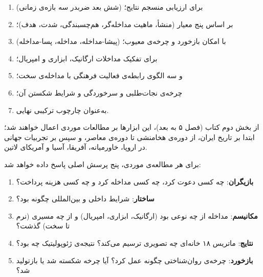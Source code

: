 \begin{enumerate}[label=\textbf{\arabic*.}, nosep, rightmargin=1em]
\item {} (شش بعد ضربدر سه
بازه‌ی زمانی) برای ارزیابی منسجم نتایج؛
\item {} بر اساس پنج معیار
(منشأ، ماهیت مداخله‌گر، هم‌چسبندگی، شدت، هدف)؛
\item {} (پیشا-مداخله، مداخله،
پسا-مداخله) با امکان بازخورد و چرخه‌ی معیوب؛
\item {} برای تفکیک مداخلات ارگانیک،
ابزاری و امپریال؛
\item {} و سه الگوی رابطه‌ی فعالیت
فرهنگی با مداخله‌ی سخت؛
\item {} چرخه‌ی نجات‌طلبی و سرخوردگی
و شرایط شکستن آن؛
\item {} به‌عنوان چارچوب ترکیبی نهایی.
\end{enumerate}

از بخش دوم کتاب (فصل ۵ به بعد)، این ابزارها بر مطالعات موردی
اعمال خواهند شد؛ ابتدا بر تاریخ ایران، از دوره‌ی هخامنشی تا
دوره‌ی معاصر، و سپس بر تجربیات جهانی در اروپا، خاورمیانه،
آفریقا، آسیا و آمریکای لاتین.

\begin{tcolorbox}[mybox,
title={پرسش راهنمای مطالعات موردی}]
برای هر مطالعه‌ی موردی، پنج پرسش اصلی پاسخ داده خواهد شد:

\begin{enumerate}[label=\textbf{پرسش \arabic*:}, nosep, rightmargin=1em]
\item \textbf{بازیگران}: چه کسی دعوت کرد، چه کسی مداخله کرد
و چه کسی هزینه پرداخت؟
\item \textbf{ساختار}: شرایط داخلی و بین‌المللی چگونه بود؟
\item \textbf{مکانیسم}: مداخله از چه نوعی بود (ارگانیک، ابزاری،
امپریال) و از چه مسیری (نرم تا سخت) گذشت؟
\item \textbf{نتایج}: ماتریس ۱۸ خانه‌ای چه تصویری ترسیم
می‌کند؟ نتیجه‌ی ژئوپولیتیک چه بود؟
\item \textbf{بازخورد}: چرخه‌ی روان‌شناختی چگونه عمل کرد؟
آیا چرخه شکسته شد یا بازتولید شد؟
\end{enumerate}
\end{tcolorbox}